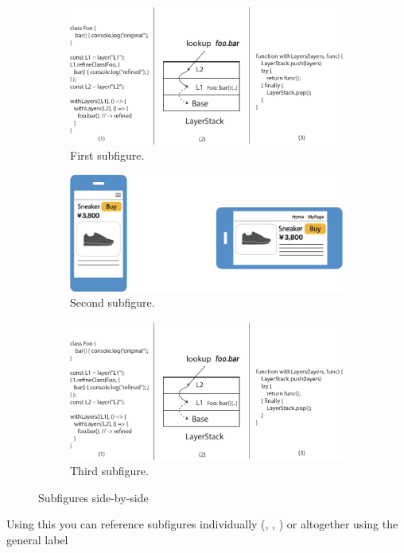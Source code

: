 \begin{figure}
\centering
\begin{subfigure}[b]{0.45\textwidth}
    \includegraphics[width=\textwidth]{figures/contextjs}
    \caption{First subfigure.}
    \label{fig:first}
\end{subfigure}
\hfill
\begin{subfigure}[b]{0.45\textwidth}
    \includegraphics[width=\textwidth]{figures/copex2}
    \caption{Second subfigure.}
    \label{fig:second}
\end{subfigure}
\hfill
\begin{subfigure}{0.4\textwidth}
    \includegraphics[width=\textwidth]{figures/contextjs}
    \caption{Third subfigure.}
    \label{fig:third}
\end{subfigure}
\caption{Subfigures side-by-side}
\label{fig:figures}
\end{figure}


Using this you can reference subfigures individually (\eg {}, , ) or altogether using the general label 

\endinput